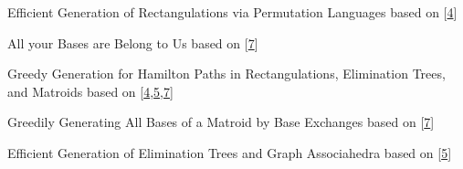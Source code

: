 \begin{cvtalks}
{\begin{cvitems}
    \end{cvitems}
  }
  \cvtalk
  {Efficient Generation of Rectangulations via Permutation Languages}
  {based on [\hyperlink{paper4}{4}]}
  {
    \begin{cvitems}
      \item {} \hfill {}
    \end{cvitems}
  }
  \cvtalk
  {All your Bases are Belong to Us}
  {based on [\hyperlink{paper7}{7}]}
  {
    \begin{cvitems}
      \item {} \hfill {} 
    \end{cvitems}
  }
  \cvtalk
  {Greedy Generation for Hamilton Paths in Rectangulations, Elimination Trees, and Matroids}
  {based on [\hyperlink{paper4}{4},\hyperlink{paper5}{5},\hyperlink{paper7}{7}]}
  {
    \begin{cvitems}
      \item {} \hfill {}
    \end{cvitems}
  }
  \cvtalk
  {Greedily Generating All Bases of a Matroid by Base Exchanges}
  {based on [\hyperlink{paper7}{7}]}
  {
    \begin{cvitems}
      \item {} \hfill {}
    \end{cvitems}
  }
  \cvtalk
  {Efficient Generation of Elimination Trees and Graph Associahedra}
  {based on [\hyperlink{paper5}{5}]}
  {
    \begin{cvitems}
      \item {} \hfill {}

\end{cvitems}}
\end{cvtalks}

